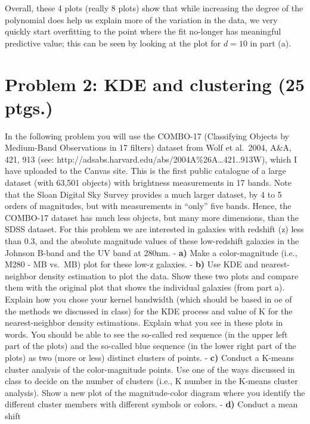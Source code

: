 \documentclass[11pt]{article}
\begin{document}
Overall, these 4 plots (really 8 plots) show that while increasing the
degree of the polynomial does help us explain more of the variation in
the data, we very quickly start overfitting to the point where the fit
no-longer has meaningful predictive value; this can be seen by looking
at the plot for \(d=10\) in part (a).

    \hypertarget{problem-2-kde-and-clustering-25-ptgs.}{%
\section{Problem 2: KDE and clustering (25
ptgs.)}\label{problem-2-kde-and-clustering-25-ptgs.}}

In the following problem you will use the COMBO-17 (Classifying Objects
by Medium-Band Observations in 17 filters) dataset from Wolf et
al.~2004, A\&A, 421, 913 (see:
http://adsabs.harvard.edu/abs/2004A\%26A\ldots{}421..913W), which I have
uploaded to the Canvas site. This is the first public catalogue of a
large dataset (with 63,501 objects) with brightness measurements in 17
bands. Note that the Sloan Digital Sky Survey provides a much larger
dataset, by 4 to 5 orders of magnitudes, but with measurements in
``only'' five bands. Hence, the COMBO-17 dataset has much less objects,
but many more dimensions, than the SDSS dataset. For this problem we are
interested in galaxies with redshift (z) less than 0.3, and the absolute
magnitude values of these low-redshift galaxies in the Johnson B-band
and the UV band at 280nm. - \textbf{a)} Make a color-magnitude (i.e.,
M280 - MB vs.~MB) plot for these low-z galaxies. - \textbf{b)} Use KDE
and nearest-neighbor density estimation to plot the data. Show these two
plots and compare them with the original plot that shows the individual
galaxies (from part a). Explain how you chose your kernel bandwidth
(which should be based in oe of the methods we discussed in class) for
the KDE process and value of K for the nearest-neighbor density
estimations. Explain what you see in these plots in words. You should be
able to see the so-called red sequence (in the upper left part of the
plots) and the so-called blue sequence (in the lower right part of the
plots) as two (more or less) distinct clusters of points. - \textbf{c)}
Conduct a K-means cluster analysis of the color-magnitude points. Use
one of the ways discussed in class to decide on the number of clusters
(i.e., K number in the K-means cluster analysis). Show a new plot of the
magnitude-color diagram where you identify the different cluster members
with different symbols or colors. - \textbf{d)} Conduct a mean shift
\end{document}
